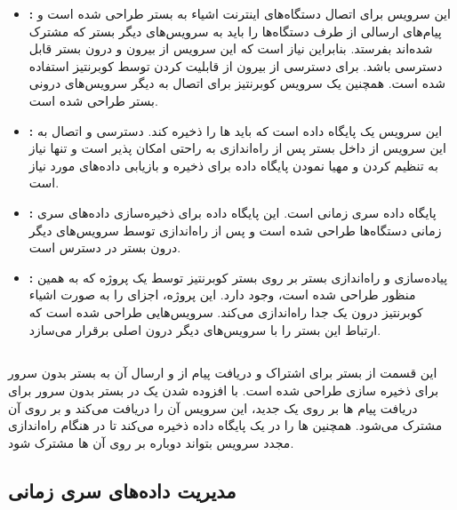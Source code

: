 \begin{itemize}
	
	\item \textbf{:} این سرویس برای اتصال دستگاه‌های اینترنت اشیاء به بستر طراحی شده است و پیام‌های ارسالی از طرف دستگاه‌ها را باید به سرویس‌های دیگر بستر که مشترک شده‌اند بفرستد. بنابراین نیاز است که این سرویس از بیرون و درون بستر قابل دسترسی باشد. برای دسترسی از بیرون از قابلیت  کردن  توسط کوبرنتیز استفاده شده است. همچنین یک سرویس کوبرنتیز برای اتصال به دیگر سرویس‌های درونی بستر طراحی شده است.
	
	\item \textbf{:} این سرویس یک پایگاه داده  است که باید  ها را ذخیره کند. دسترسی و اتصال به این سرویس از داخل بستر پس از راه‌اندازی به راحتی امکان پذیر است و تنها نیاز به تنظیم کردن و مهیا نمودن پایگاه داده برای ذخیره و بازیابی داده‌های مورد نیاز است. 
	
	\item \textbf{:} پایگاه داده سری زمانی  است. این پایگاه داده برای ذخیره‌سازی داده‌های سری زمانی دستگاه‌ها طراحی شده است و پس از راه‌اندازی توسط سرویس‌های دیگر درون بستر در دسترس است.
	
	\item \textbf{:} پیاده‌سازی و راه‌اندازی بستر  بر روی بستر کوبرنتیز توسط یک پروژه که به همین منظور طراحی شده است، وجود دارد. این پروژه، اجزای  را به صورت اشیاء کوبرنتیز درون یک  جدا راه‌اندازی می‌کند. سرویس‌هایی طراحی شده است که ارتباط این بستر را با سرویس‌های دیگر درون  اصلی برقرار می‌سازد.
	
\end{itemize}

\subsection{}

این قسمت از بستر برای اشتراک و دریافت پیام از   و ارسال آن به بستر بدون سرور برای ذخیره سازی طراحی شده است. با افزوده شدن یک  در بستر بدون سرور برای دریافت پیام ها بر روی یک  جدید، این سرویس آن را دریافت می‌کند و بر روی آن  مشترک می‌شود. همچنین  ها را در یک پایگاه داده ذخیره می‌کند تا در هنگام راه‌اندازی مجدد سرویس بتواند  دوباره بر روی آن  ها مشترک شود.

\subsection{مدیریت داده‌های سری زمانی}

